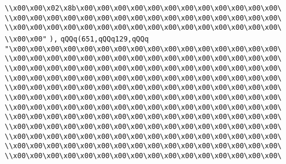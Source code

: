 \verb|\\x00\x00\x02\x8b\x00\x00\x00\x00\x00\x00\x00\x00\x00\x00\x00\x00\|\newline
\verb|\\x00\x00\x00\x00\x00\x00\x00\x00\x00\x00\x00\x00\x00\x00\x00\x00\|\newline
\verb|\\x00\x00\x00\x00\x00\x00\x00\x00\x00\x00\x00\x00\x00\x00\x00\x00\|\newline
\verb|\\x00\x00"|\newline
\verb|),|\newline
\verb|qQQq(651,qQQq129,qQQq|\newline
\verb|"\x00\x00\x00\x00\x00\x00\x00\x00\x00\x00\x00\x00\x00\x00\x00\x00\|\newline
\verb|\\x00\x00\x00\x00\x00\x00\x00\x00\x00\x00\x00\x00\x00\x00\x00\x00\|\newline
\verb|\\x00\x00\x00\x00\x00\x00\x00\x00\x00\x00\x00\x00\x00\x00\x00\x00\|\newline
\verb|\\x00\x00\x00\x00\x00\x00\x00\x00\x00\x00\x00\x00\x00\x00\x00\x00\|\newline
\verb|\\x00\x00\x00\x00\x00\x00\x00\x00\x00\x00\x00\x00\x00\x00\x00\x00\|\newline
\verb|\\x00\x00\x00\x00\x00\x00\x00\x00\x00\x00\x00\x00\x00\x00\x00\x00\|\newline
\verb|\\x00\x00\x00\x00\x00\x00\x00\x00\x00\x00\x00\x00\x00\x00\x00\x00\|\newline
\verb|\\x00\x00\x00\x00\x00\x00\x00\x00\x00\x00\x00\x00\x00\x00\x00\x00\|\newline
\verb|\\x00\x00\x00\x00\x00\x00\x00\x00\x00\x00\x00\x00\x00\x00\x00\x00\|\newline
\verb|\\x00\x00\x00\x00\x00\x00\x00\x00\x00\x00\x00\x00\x00\x00\x00\x00\|\newline
\verb|\\x00\x00\x00\x00\x00\x00\x00\x00\x00\x00\x00\x00\x00\x00\x00\x00\|\newline
\verb|\\x00\x00\x00\x00\x00\x00\x00\x00\x00\x00\x00\x00\x00\x00\x00\x00\|\newline
